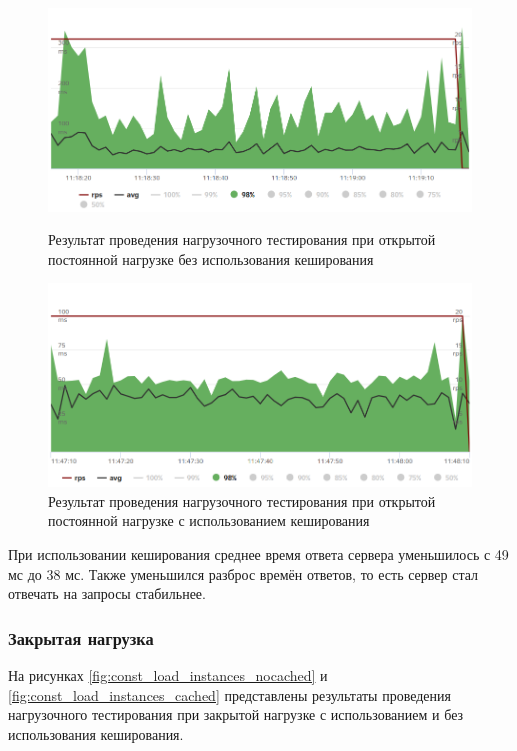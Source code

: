 \begin{figure}[h]
	\centering
	\includegraphics[width=\textwidth ]{img/Load_testing/const_load_rps_nocached.png}
	\caption{Результат проведения нагрузочного тестирования при открытой постоянной нагрузке без использования кеширования}
	\label{fig:const_load_rps_nocached}
	
	\centering
	\includegraphics[width=\textwidth ]{img/Load_testing/const_load_rps_cached.png}
	\caption{Результат проведения нагрузочного тестирования при открытой постоянной нагрузке с использованием кеширования}
	\label{fig:const_load_rps_cached}
\end{figure} 

\clearpage

При использовании кеширования среднее время ответа сервера уменьшилось с 49 мс до 38 мс. Также уменьшился разброс времён ответов, то есть сервер стал отвечать на запросы стабильнее. %

\subsubsection{Закрытая нагрузка}

На рисунках \ref{fig:const_load_instances_nocached} и \ref{fig:const_load_instances_cached} представлены результаты проведения нагрузочного тестирования при закрытой нагрузке с использованием и без использования кеширования.

